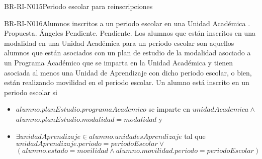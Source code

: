 \begin{BusinessRule}{BR-RI-N015}{Periodo escolar para reinscripciones}
	
\end{BusinessRule}

\begin{BusinessRule}{BR-RI-N016}{Alumnos inscritos a un periodo escolar en una Unidad Académica}
	{\bcDerivation}    %
	{\btEnabler}     %
	{\blControlling}    %
	.
	\BRItem[Estado] Propuesta.
	 Ángeles
	 Pendiente.
	 Pendiente.
	\BRItem[Descripción] Los alumnos que están inscritos en una modalidad en una Unidad Académica para un periodo escolar son aquellos alumnos que están asociados con un plan de estudio de la modalidad asociado a un Programa Académico que se imparta en la Unidad Académica y tienen asociada al menos una Unidad de Aprendizaje con dicho periodo escolar, o bien, están realizando movilidad en el periodo escolar.
	\BRItem[Sentencia] Un alumno está inscrito en un periodo escolar si
	\begin{itemize}
		\item $alumno.planEstudio.programaAcademico$ se imparte en $unidadAcademica \land$\\$ alumno.planEstudio.modalidad = modalidad$ y  
		\item $\exists unidadAprendizaje \in alumno.unidadesAprendizaje$ tal que $ unidadAprendizaje.periodo = periodoEscolar \lor$  $(alumno.estado=movilidad \land alumno.movilidad.periodo = periodoEscolar)$
	\end{itemize}
	

\end{BusinessRule}
